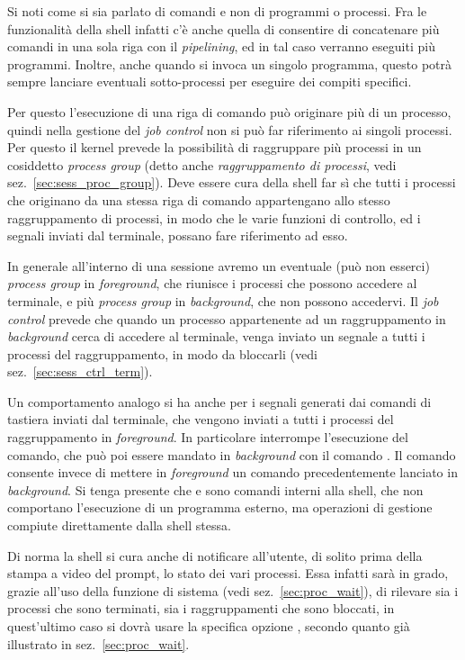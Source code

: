 Si noti come si sia parlato di comandi e non di programmi o processi. Fra le
funzionalità della shell infatti c'è anche quella di consentire di concatenare
più comandi in una sola riga con il \textit{pipelining}, ed in tal caso
verranno eseguiti più programmi. Inoltre, anche quando si invoca un singolo
programma, questo potrà sempre lanciare eventuali sotto-processi per eseguire
dei compiti specifici.

Per questo l'esecuzione di una riga di comando può originare più di un
processo, quindi nella gestione del \textit{job control} non si può far
riferimento ai singoli processi.  Per questo il kernel prevede la possibilità
di raggruppare più processi in un cosiddetto \textit{process group} (detto
anche \textsl{raggruppamento di processi}, vedi
sez.~\ref{sec:sess_proc_group}). Deve essere cura della shell far sì che tutti
i processi che originano da una stessa riga di comando appartengano allo
stesso raggruppamento di processi, in modo che le varie funzioni di controllo,
ed i segnali inviati dal terminale, possano fare riferimento ad esso.

In generale all'interno di una sessione avremo un eventuale (può non esserci)
\textit{process group} in \textit{foreground}, che riunisce i processi che
possono accedere al terminale, e più \textit{process group} in
\textit{background}, che non possono accedervi. Il \textit{job control}
prevede che quando un processo appartenente ad un raggruppamento in
\textit{background} cerca di accedere al terminale, venga inviato un segnale a
tutti i processi del raggruppamento, in modo da bloccarli (vedi
sez.~\ref{sec:sess_ctrl_term}).

Un comportamento analogo si ha anche per i segnali generati dai comandi di
tastiera inviati dal terminale, che vengono inviati a tutti i processi del
raggruppamento in \textit{foreground}. In particolare  interrompe
l'esecuzione del comando, che può poi essere mandato in \textit{background}
con il comando . Il comando  consente invece di mettere in
\textit{foreground} un comando precedentemente lanciato in
\textit{background}. Si tenga presente che  e  sono comandi
interni alla shell, che non comportano l'esecuzione di un programma esterno,
ma operazioni di gestione compiute direttamente dalla shell stessa.

Di norma la shell si cura anche di notificare all'utente, di solito prima
della stampa a video del prompt, lo stato dei vari processi. Essa infatti sarà
in grado, grazie all'uso della funzione di sistema  (vedi
sez.~\ref{sec:proc_wait}), di rilevare sia i processi che sono terminati, sia
i raggruppamenti che sono bloccati, in quest'ultimo caso si dovrà usare la
specifica opzione , secondo quanto già illustrato in
sez.~\ref{sec:proc_wait}.


